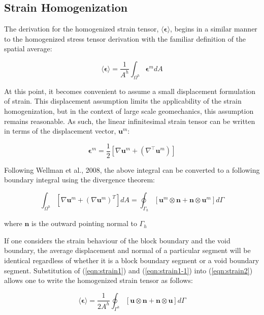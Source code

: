 \subsection{Strain Homogenization}

The derivation for the homogenized strain tensor, $\langle\boldsymbol{\epsilon}\rangle$, begins in a similar manner to the homogenized stress tensor derivation with the familiar definition of the spatial average:

\begin{equation}
\langle\boldsymbol{\epsilon}\rangle=\frac{1}{A^{h}}\int_{\Omega^{h}}\boldsymbol{\epsilon}^m dA\label{eqn:strain2}
\end{equation}

At this point, it becomes convenient to assume a small displacement formulation of strain. This displacement assumption limits the applicability of the strain homogenization, but in the context of large scale geomechanics, this assumption remains reasonable. As such, the linear infinitesimal strain tensor can be written in terms of the displacement vector, $\mathbf{u}^m$:

\begin{equation}
\boldsymbol{\epsilon}^m=\frac{1}{2}\left[\nabla\mathbf{u}^m+\left(\nabla^\top \mathbf{u}^m\right)\right]\label{eqn:strain1}
\end{equation}

Following Wellman et al., 2008, the above integral can be converted to a following boundary integral using the divergence theorem:

\begin{equation}
\int_{\Omega^h}\left[\nabla\mathbf{u}^m+\left(\nabla\mathbf{u}^m\right)^{T}\right]dA=\oint_{\Gamma_h}\left[\mathbf{u}^m\otimes\mathbf{n}+\mathbf{n}\otimes\mathbf{u}^m\right]d\Gamma\label{eqn:strain1-1}
\end{equation}

where $\mathbf{n}$ is the outward pointing normal to $\Gamma_h$

If one considers the strain behaviour of the block boundary and the void boundary, the average displacement and normal of a particular segment
will be identical regardless of whether it is a block boundary segment or a void boundary segment. Substitution of (\ref{eqn:strain1}) and (\ref{eqn:strain1-1}) into (\ref{eqn:strain2}) allows one to write the homogenized strain tensor as follows:

\begin{equation}
\langle\boldsymbol{\epsilon}\rangle=\frac{1}{2A^{h}}\oint_{\Gamma^{h}}\left[\mathbf{u}\otimes\mathbf{n}+\mathbf{n}\otimes\mathbf{u}\right]d\Gamma\label{eqn:strain5-1}
\end{equation}


